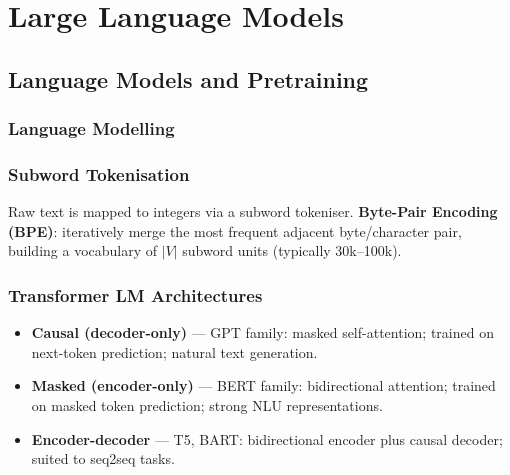 \documentclass[oneside]{book}
\begin{document}
\part{Large Language Models}

\chapter{Language Models and Pretraining}

\section{Language Modelling}


\section{Subword Tokenisation}

Raw text is mapped to integers via a subword tokeniser.
\textbf{Byte-Pair Encoding (BPE)}: iteratively merge the most frequent
adjacent byte/character pair, building a vocabulary of $|V|$ subword units
(typically 30k--100k).

\section{Transformer LM Architectures}

\begin{itemize}
  \item \textbf{Causal (decoder-only)} — GPT family: masked self-attention;
        trained on next-token prediction; natural text generation.
  \item \textbf{Masked (encoder-only)} — BERT family: bidirectional attention;
        trained on masked token prediction; strong NLU representations.
  \item \textbf{Encoder-decoder} — T5, BART: bidirectional encoder plus
        causal decoder; suited to seq2seq tasks.
\end{itemize}
\end{document}
